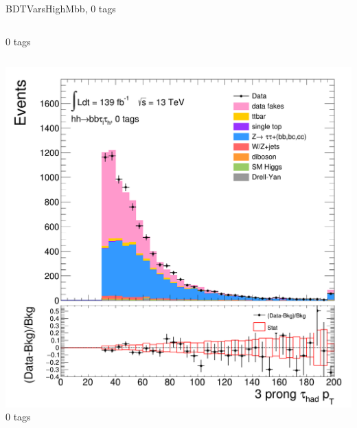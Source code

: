 \begin{frame}{BDTVarsHighMbb, 0 tags}
\begin{columns}[c]
    0 tags
  \end{columns}
  \begin{columns}[c]
    \centering\includegraphics[width=\textwidth]{C_0tag2pjet_0ptv_TauPt3P}\\
    0 tags
  \end{columns}
\end{frame}

